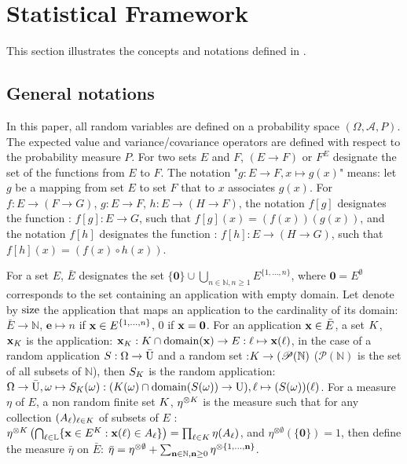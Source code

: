 \section{Statistical Framework} \label{sec:stat_fra}
This section illustrates the concepts and notations defined in \cite{dbb1}.
\subsection{General notations}

In this paper, all random variables are defined on a probability space $(\Omega,\mathscr{A},P)$. The expected value and variance/covariance operators are defined with respect to the probability measure $P$. 
For two sets $E$ and $F$, $(E\to F)$ or $F^E$ designate the set of the functions from $E$ to $F$.
The notation "$g:E\to F,x\mapsto g(x)$" means: let $g$ be a mapping from set $E$ to set $F$ that to $x$ associates $g(x)$. For $f:E\to (F\to G)$, $g:E\to F$, $h:E\to (H\to F)$,  the notation $f[g]$ designates the function :  $f[g]:E\to G$, such that $f[g](x)=(f(x))(g(x))$, and the notation 
$f[h]$ designates the function :  $f[h]:E\to (H\to G)$, such that $f[h](x)=(f(x)\circ h(x))$.


For a set $E$, $\bar{E}$ designates the set $\{\mathbf{0}\}\cup\bigcup_{n\in\mathbb{N},n\geq 1} E^{\{1,\ldots,n\}}$, where $\mathbf{0}=E^\emptyset$ corresponds to the set containing an application with empty domain.
Let denote by $\mathrm{size} $ the application that maps an application to the cardinality of its domain: $\bar{E}\to\mathbb{N}$, $\mathbf{e}\mapsto n$ if $\mathbf{x}\in E^{\{1,\ldots,n\}}$, $0$ if $\mathbf{x}=\mathbf{0}$. For an application $\mathbf{x}\in\bar{E}$, a set $K$, $\mathbf{x}_K$ is the application:
$\mathbf{x}_K:K\cap\mathrm{domain}(\mathbf{x})\to E:\ell\mapsto\mathbf{x}(\ell)$, in the case of a random application $S:\Omega\to\bar{\mathrm{U}}$ and a random set :$K\to(\mathscr{P}(\mathbb{N})$ ($\mathscr{P}(\mathbb{N})$ is the set of all subsets of $\mathbb{N}$), then $S_K$ is the random application: $\Omega\to\bar{\mathrm{U}}, 
\omega\mapsto 
S_K(\omega):(K(\omega)\cap\mathrm{domain}(S(\omega))\to \mathrm{U}),
\ell\mapsto (S(\omega))(\ell)$.
For a measure $\eta$ of $E$, a non random finite set $K$, $\eta^{\otimes K}$ is the measure such that for any collection $(A_\ell)_{\ell\in K}$ of subsets of $E$  :
$\eta^{\otimes K}\left(\bigcap_{\ell\in\mathbb{L}}\{\mathbf{x}\in E^K:\mathbf{x}(\ell)\in A_\ell\}\right)=\prod_{\ell\in K}\eta(A_\ell)$, and
$\eta^{\otimes\emptyset}(\{\mathbf{0}\})=1$, 
then define the measure $\bar{\eta}$ on $\bar{E}$: $\bar{\eta}=\eta^{\otimes\emptyset}+\sum_{\mathbf{n}\in\mathbb{N},\mathbf{n}\geq 0}\eta^{\otimes\{1,\ldots,\mathbf{n}\}}$.

